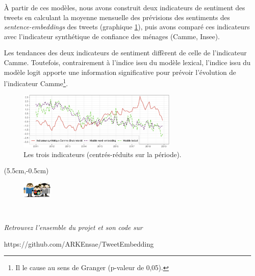 \documentclass[10pt,french,french]{article}
\let\rmarkdownfootnote\footnote%
\def\footnote{\protect\rmarkdownfootnote}
\begin{document}
À partir de ces modèles, nous avons construit deux indicateurs de
sentiment des tweets en calculant la moyenne mensuelle des prévisions
des sentiments des \emph{sentence-embeddings} des tweets (graphique
\ref{fig:bslogcam}), puis avons comparé ces indicateurs avec
l'indicateur synthétique de confiance des ménages (Camme, Insee).

Les tendances des deux indicateurs de sentiment diffèrent de celle de
l'indicateur Camme. Toutefois, contrairement à l'indice issu du modèle
lexical, l'indice issu du modèle logit apporte une information
significative pour prévoir l'évolution de l'indicateur Camme\footnote{Il
  le cause au sens de Granger (p-valeur de 0,05).}.

\begin{figure}[!htp]
\begin{center}
\includegraphics[width =0.7\textwidth]{img/rmd-graphSentiments-1}
\captionsetup{margin=0cm,format=hang,justification=justified}
\caption{Les trois indicateurs (centrés-réduits sur la période).}\label{fig:bslogcam}
\end{center}
\end{figure}

\begin{textblock*}{\textwidth}(5.5cm,-0.5cm)
\begin{center}
\begin{minipage}{0.7\textwidth}

\begin{figure}
\includegraphics[height=0.8cm]{img/avatars.png}
\end{figure}

$\phantom{saut}$

\emph{Retrouvez l'ensemble du projet et son code sur}

https://github.com/ARKEnsae/TweetEmbedding

\end{minipage}
\end{center}

\end{textblock*}
\end{document}
